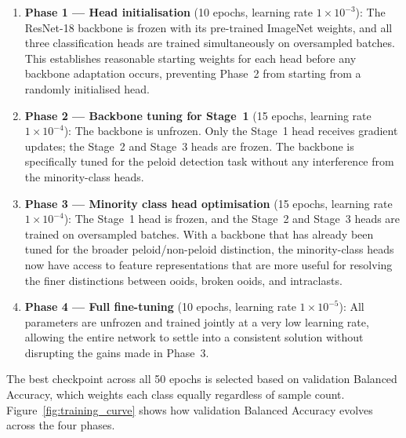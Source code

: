 \documentclass[a4paper,fleqn]{cas-dc}
\begin{document}
\begin{enumerate}
  \item \textbf{Phase 1 --- Head initialisation} (10 epochs, learning rate $1\times10^{-3}$): The ResNet-18 backbone is frozen with its pre-trained ImageNet weights, and all three classification heads are trained simultaneously on oversampled batches. This establishes reasonable starting weights for each head before any backbone adaptation occurs, preventing Phase~2 from starting from a randomly initialised head.

  \item \textbf{Phase 2 --- Backbone tuning for Stage~1} (15 epochs, learning rate $1\times10^{-4}$): The backbone is unfrozen. Only the Stage~1 head receives gradient updates; the Stage~2 and Stage~3 heads are frozen. The backbone is specifically tuned for the peloid detection task without any interference from the minority-class heads.

  \item \textbf{Phase 3 --- Minority class head optimisation} (15 epochs, learning rate $1\times10^{-4}$): The Stage~1 head is frozen, and the Stage~2 and Stage~3 heads are trained on oversampled batches. With a backbone that has already been tuned for the broader peloid/non-peloid distinction, the minority-class heads now have access to feature representations that are more useful for resolving the finer distinctions between ooids, broken ooids, and intraclasts.

  \item \textbf{Phase 4 --- Full fine-tuning} (10 epochs, learning rate $1\times10^{-5}$): All parameters are unfrozen and trained jointly at a very low learning rate, allowing the entire network to settle into a consistent solution without disrupting the gains made in Phase~3.
\end{enumerate}

The best checkpoint across all 50 epochs is selected based on validation Balanced Accuracy, which weights each class equally regardless of sample count. Figure~\ref{fig:training_curve} shows how validation Balanced Accuracy evolves across the four phases.
\end{document}
